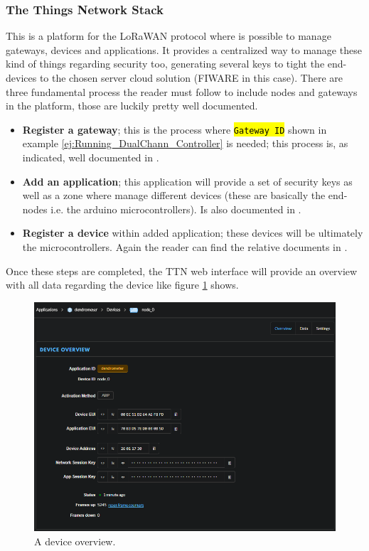 \documentclass[11pt,a4paper,dvipsnames,twoside]{article}
\newcommand{\cmd}[1] {\hl{\texttt{#1}}}
\begin{document}
\subsubsection{The Things Network Stack}\label{sssec:TTN_Stack}
This is a platform for the LoRaWAN protocol where is possible to manage gateways, devices and applications. It provides a centralized way to manage these kind of things regarding security too, generating several keys to tight the end-devices to the chosen server cloud solution (FIWARE in this case). There are three fundamental process the reader must follow to include nodes and gateways in the platform, those are luckily pretty well documented. 

\begin{itemize}
  \item \textbf{Register a gateway}; this is the process where \cmd{Gateway ID} shown in example \ref{ej:Running_DualChann_Controller} is needed; this process is, as indicated, well documented in \cite{Gateway_reg}.
  \item \textbf{Add an application}; this application will provide a set of security keys as well as a zone where manage different devices (these are basically the end-nodes i.e. the arduino microcontrollers). Is also documented in \cite{Add_application}.
  \item \textbf{Register a device} within added application; these devices will be ultimately the microcontrollers. Again the reader can find the relative documents in \cite{Device_reg}. 
\end{itemize}

Once these steps are completed, the TTN web interface will provide an overview with all data regarding the device like figure \ref{fig:dev_overview} shows. 

\begin{figure}[ht]
  \centering
  \includegraphics[width=.9\textwidth]{../pictures/TTN_dev_overview.png}
  \caption{A device overview.}
  \label{fig:dev_overview}
\end{figure}
\end{document}
